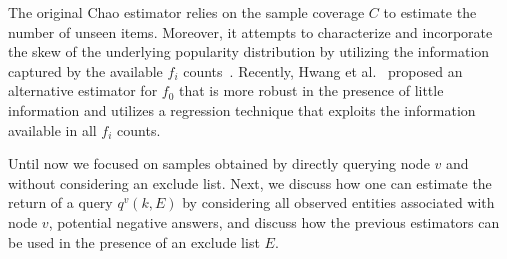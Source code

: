 The original Chao estimator relies on the sample coverage $C$ to estimate the number of unseen items. Moreover, it attempts to characterize and incorporate the skew of the underlying popularity distribution by utilizing the information captured by the available $f_i$ counts~\cite{chao:1992}. Recently, Hwang et al.~\cite{hwang:2010} proposed an alternative estimator for $f_0$ that is more robust in the presence of little information and utilizes a regression technique that exploits the information available in all $f_i$ counts.  

Until now we focused on samples obtained by directly querying node $v$ and without considering an exclude list. Next, we discuss how one can estimate the return of a query $q^v(k,E)$ by considering all observed entities associated with node $v$, potential negative answers, and discuss how the previous estimators can be used in the presence of an exclude list $E$.

